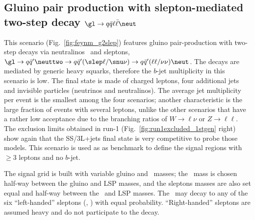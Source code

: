 \subsection{Gluino pair production with slepton-mediated two-step decay $\gl\to q\bar q\ell\bar\ell\neut$}
\label{subsec:signals_g2slep}

This scenario (Fig.~\ref{fig:feynm_g2slep}) features gluino pair-production with two-step decays via neutralinos \neuttwo\ and sleptons, 
$\gl\to q\bar{q}'\neuttwo \to q\bar{q}'(\slep\ell/\snu\nu) \to q\bar{q}'(\ell\ell/\nu\nu)\neut$. 
The decays are mediated by generic heavy squarks, therefore the $b$-jet multiplicity in this scenario is low. 
The final state is made of charged leptons, four additional jets and invisible particles (neutrinos and neutralinos). 
The average jet multiplicity per event is the smallest among the four scenarios;  
another characteristic is the large fraction of events with several leptons, 
unlike the other scenarios that have a rather low acceptance due to the branching ratios of $W\to\ell\nu$ or $Z\to\ell\ell$. 
The exclusion limits obtained in run-1 (Fig.~\ref{fig:run1excluded_1stgen} right) show again that the SS/3L+jets final state 
is very competitive to probe those models. 
This scenario is used as as benchmark to define the signal regions with $\ge 3$ leptons and no $b$-jet. 

The signal grid is built with variable gluino and \neut\ masses; the \neuttwo\ mass is chosen half-way between the gluino and LSP masses, 
and the sleptons masses are also set equal and half-way between the \neuttwo\ and LSP masses. 
The \neuttwo\ may decay to any of the six ``left-handed'' sleptons (\slep, \snu) with equal probability. 
``Right-handed'' sleptons are assumed heavy and do not participate to the decay. 


